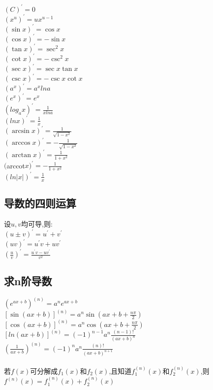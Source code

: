 \documentclass{article}
\begin{document}
\begin{flushleft}
	$(C)^{'}=0$\\
	$(x^u)^{'}=ux^{u-1}$\\
	$(\sin x)^{'}=\cos x$\\
	$(\cos x)^{'}=-\sin x$\\
	$(\tan x)^{'}=\sec^2 x$\\
	$(\cot x)^{'}=-\csc^2 x$\\
	$(\sec x)^{'}=\sec x\tan x$\\
	$(\csc x)^{'}=-\csc x\cot x$\\
	$(a^x)^{'}=a^xlna$\\
	$(e^x)^{'}=e^x$\\
	$(log_ax)^{'}=\frac{1}{xlna}$\\
	$(lnx)^{'}=\frac{1}{x}$\\
	$(\arcsin x)^{'}=\frac{1}{\sqrt{1-x^2}}$\\
	$(\arccos x)^{'}=-\frac{1}{\sqrt{1-x^2}}$\\
	$(\arctan x)^{'}=\frac{1}{1+x^2}$\\
	$($arccot$ x)^{'}=-\frac{1}{1+x^2}$\\
	$(ln|x|)^{'}=\frac{1}{x}$\\
	
	\subsection{导数的四则运算}
	
	设$u,v$均可导,则:\\
	$(u\pm v)^{'}=u^{'}+v^{'}$\\
	$(uv)^{'}=u^{'}v+uv^{'}$\\
	$(\frac{u}{v})^{'}=\frac{u^{'}v-uv^{'}}{v^2}$\\
	
	\subsection{求n阶导数}
	
	$(e^{ax+b})^{(n)}=a^ne^{ax+b}$\\
	$[\sin(ax+b)]^{(n)}=a^n\sin(ax+b+\frac{n\pi}{2})$\\
	$[\cos(ax+b)]^{(n)}=a^n\cos(ax+b+\frac{n\pi}{2})$\\
	$[ln(ax+b)]^{(n)}=(-1)^{n-1}a^n\frac{(n-1)!}{(ax+b)^n}$\\
	$(\frac{1}{ax+b})^{(n)}=(-1)^{n}a^n\frac{(n)!}{(ax+b)^{n+1}}$\\
	~\\
	若$f(x)$可分解成$f_1(x)$和$f_2(x)$,且知道$f_1^{(n)}(x)$和$f_2^{(n)}(x)$,则$f^{(n)}(x)=f_1^{(n)}(x)+f_2^{(n)}(x)$\\
	~\\

\end{flushleft}
\end{document}
